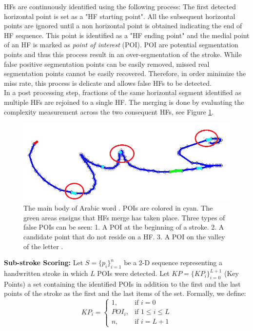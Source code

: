 \documentclass[10pt, conference, compsocconf]{IEEEtran}
\begin{document}
HFs are continuously identified using the following process: 
The first detected horizontal point is set as a "HF starting point". 
All the subsequent horizontal points are ignored until a non horizontal point is obtained indicating the end of HF sequence. 
This point is identified as a "HF ending point" and the medial point of an HF is marked as \emph{point of interest} (POI). 
POI are potential segmentation points and thus this process result in an over-segmentation of the stroke. 
While false positive segmentation points can be easily removed, missed real segmentation points cannot be easily recovered. 
Therefore, in order minimize the miss rate, this process is delicate and allows false HFs to be detected.\\

In a post processing step, fractions of the same horizontal segment identified as multiple HFs are rejoined to a single HF. 
The merging is done by evaluating the complexity measurement across the two consequent HFs, see Figure \ref{fig:candidate_in_no_horizontal}.\\

\begin{figure}
\centering
\includegraphics[width=0.5\columnwidth]{./figures/candidate_in_no_horizontal}
\caption{The main body of Arabic word . POIs are colored in cyan. The green areas ensigns that HFs merge has taken place. Three types of false POIs can be seen: 1. A POI at the beginning of a stroke. 2. A candidate point that do not reside on a HF. 3. A POI on the valley of the letter . }
\label{fig:candidate_in_no_horizontal}
\end{figure}

\textbf{Sub-stroke Scoring:}
Let $S=\{p_{i}\}_{i=1}^{n}$ be a 2-D sequence representing a handwritten stroke in which $L$ POIs were detected. 
Let $KP=\{KP_{i}\}_{i=0}^{L+1}$ (Key Points) a set containing the identified POIs in addition to the first and the last points of the stroke as the first and the last items of the set.
Formally, we define: 
\begin{equation}
KP_{i} =\begin{cases}    1		, & \mbox{if } i=0 \\
							   POI_{i}	, & \mbox{if } 1\leq i \leq L \\
							   n    , & \mbox{if } i=L+1 
			\end{cases}				
\end{equation}
\end{document}
